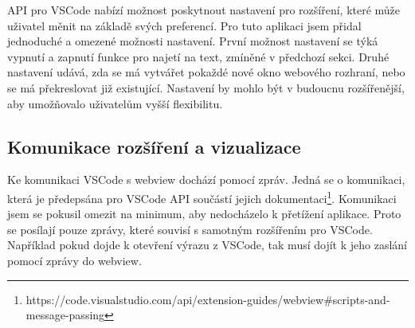 API pro VSCode nabízí možnost poskytnout nastavení pro rozšíření, které může uživatel měnit na základě svých preferencí.
Pro tuto aplikaci jsem přidal jednoduché a omezené možnosti nastavení.
První možnost nastavení se týká vypnutí a zapnutí funkce pro najetí na text, zmíněné v předchozí sekci.
Druhé nastavení udává, zda se má vytvářet pokaždé nové okno webového rozhraní, nebo se má překreslovat již existující.
Nastavení by mohlo být v budoucnu rozšířenější, aby umožňovalo uživatelům vyšší flexibilitu. 

\subsection*{Komunikace rozšíření a vizualizace}

Ke komunikaci VSCode s webview dochází pomocí zpráv.
Jedná se o komunikaci, která je předepsána pro VSCode API součástí jejich dokumentaci\footnote{https://code.visualstudio.com/api/extension-guides/webview\#scripts-and-message-passing}.
Komunikaci jsem se pokusil omezit na minimum, aby nedocházelo k přetížení aplikace.
Proto se posílají pouze zprávy, které souvisí s samotným rozšířením pro VSCode.
Například pokud dojde k otevření výrazu z VSCode, tak musí dojít k jeho zaslání pomocí zprávy do webview.

\endinput
